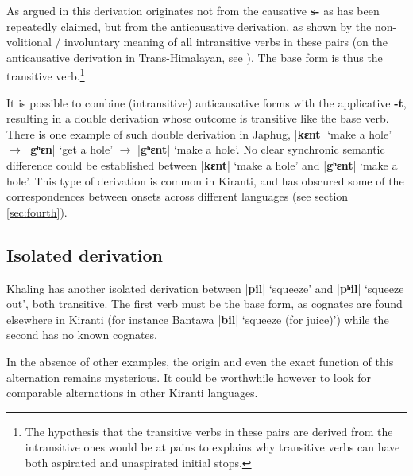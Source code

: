 \documentclass[oneside,a4paper,11pt]{article}
\newcommand{\ipa}[1]{\textbf{{\phon\mbox{#1}}}} %
\newcommand{\dhatu}[2]{|\ipa{#1}| `#2'}
\begin{document}
As argued in \citet{jacques15derivational.khaling} this derivation originates not from the causative \ipa{s-} as has been repeatedly claimed, but from the anticausative derivation, as shown by the non-volitional / involuntary meaning of all intransitive verbs in these pairs (on the anticausative derivation in Trans-Himalayan, see  \citealt{jacques15spontaneous, jacques15causative, hill14voicing}). The base form is thus the transitive verb.\footnote{The hypothesis that the transitive verbs in these pairs are derived from the intransitive ones would be at pains to explains why transitive verbs can have both aspirated and unaspirated initial stops.}

It is possible to combine (intransitive) anticausative forms with the applicative \ipa{-t}, resulting in a double derivation whose outcome is transitive like the base verb. There is one example of such double derivation in Japhug, \dhatu{kɛnt}{make a hole} $\rightarrow$  \dhatu{gʰɛn}{get a hole} $\rightarrow$  \dhatu{gʰɛnt}{make a hole}. No clear synchronic semantic difference could be established between \dhatu{kɛnt}{make a hole} and \dhatu{gʰɛnt}{make a hole}. This type of derivation is common in Kiranti, and has obscured some of the correspondences between onsets across different languages (see section \ref{sec:fourth}).

\subsection{Isolated derivation} \label{sec:isolated}
Khaling has another isolated derivation between \dhatu{pil}{squeeze} and  \dhatu{pʰil}{squeeze out}, both transitive. The first verb must be the base form, as cognates are found elsewhere in Kiranti (for instance Bantawa \dhatu{bil}{squeeze (for juice)}) while the second has no known cognates. 



In the absence of other examples, the origin and even the exact function of this alternation remains mysterious. It could be worthwhile however to look for comparable alternations in other Kiranti languages.
\end{document}
